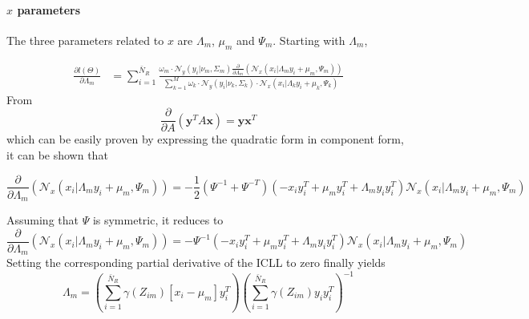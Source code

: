 \paragraph{$x$ parameters}
The three parameters related to $x$ are $\Lambda_m$, $\mu_m$ and $\Psi_m$. Starting with $\Lambda_m$,

\begin{align}
\frac{\partial l(\Theta)}{\partial \Lambda_m} &= \sum\limits_{i = 1}^{\bar{N}_R}
\frac{\omega_m\cdot
\mathcal{N}_y\left(y_i\vert\nu_m,\Sigma_m\right)\frac{\partial }{\partial \Lambda_m}\left(\mathcal{N}_x\left(x_i\vert\Lambda_my_i + \mu_m,\Psi_m\right)\right)}{\sum\limits_{k = 1}^{M}\omega_k\cdot
\mathcal{N}_y\left(y_i\vert\nu_k,\Sigma_k\right)\cdot\mathcal{N}_x\left(x_i\vert\Lambda_ky_i + \mu_k,\Psi_k\right) }
\end{align}
From 
\begin{equation}
\frac{\partial }{\partial A}\left(\mathbf{y}^T A\mathbf{x}\right) = \mathbf{y}\mathbf{x}^T
\end{equation}
which can be easily proven by expressing the quadratic form in component form, 
it can be shown that 

\begin{equation}
\frac{\partial }{\partial \Lambda_m}\left(\mathcal{N}_x\left(x_i\vert\Lambda_my_i + \mu_m,\Psi_m\right)\right) = - \frac{1}{2}\left(\Psi^{-1} + \Psi^{-T}\right)\left(-x_iy_i^T + \mu_my_i^T + \Lambda_my_iy_i^T\right)\mathcal{N}_x\left(x_i\vert\Lambda_my_i + \mu_m,\Psi_m\right)
\end{equation}

Assuming that $\Psi$ is symmetric, it reduces to
\begin{equation}
\frac{\partial }{\partial \Lambda_m}\left(\mathcal{N}_x\left(x_i\vert\Lambda_my_i + \mu_m,\Psi_m\right)\right) = -\Psi^{-1}\left(-x_iy_i^T + \mu_my_i^T + \Lambda_my_iy_i^T\right)\mathcal{N}_x\left(x_i\vert\Lambda_my_i + \mu_m,\Psi_m\right)
\end{equation}
Setting the corresponding partial derivative of the ICLL to zero finally yields
\begin{equation}
\boxed{
\Lambda_m =\left(
\sum\limits_{i = 1}^{\bar{N}_R}\gamma(Z_{im})\left[x_i - \mu_m\right]y_i^T\right) \left( \sum\limits_{i = 1}^{\bar{N}_R}\gamma(Z_{im})y_iy_i^T\right)^{-1}
}
\end{equation}

